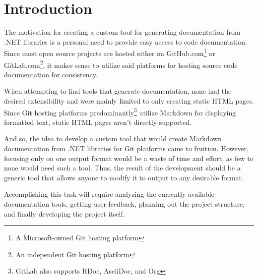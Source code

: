 \chapter*{Introduction}

The motivation for creating a custom tool for generating documentation from .NET libraries is a personal need to provide easy access to code documentation. Since most open source projects are hosted either on GitHub.com\footnote{A Microsoft-owned Git hosting platform} or GitLab.com\footnote{An independent Git hosting platform}, it makes sense to utilize said platforms for hosting source code documentation for consistency.

When attempting to find tools that generate documentation, none had the desired extensibility and were mainly limited to only creating static HTML pages. Since Git hosting platforms predominantly\footnote{GitLab also supports RDoc, AsciiDoc, and Org} utilize Markdown for displaying formatted text, static HTML pages aren't directly supported.

And so, the idea to develop a custom tool that would create Markdown documentation from .NET libraries for Git platforms came to fruition. However, focusing only on one output format would be a waste of time and effort, as few to none would need such a tool. Thus, the result of the development should be a generic tool that allows anyone to modify it to output to any desirable format.

Accomplishing this task will require analyzing the currently available documentation tools, getting user feedback, planning out the project structure, and finally developing the project itself.
